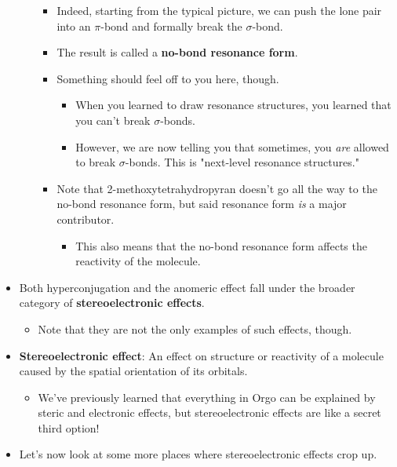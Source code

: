 \documentclass[../notes.tex]{subfiles}
\begin{document}
\begin{itemize}
\begin{itemize}
        \begin{itemize}
            \item Indeed, starting from the typical picture, we can push the lone pair into an  $\pi$-bond and formally break the  $\sigma$-bond.
            \item The result is called a \textbf{no-bond resonance form}.
            \item Something should feel off to you here, though.
            \begin{itemize}
                \item When you learned to draw resonance structures, you learned that you can't break $\sigma$-bonds.
                \item However, we are now telling you that sometimes, you \emph{are} allowed to break $\sigma$-bonds. This is "next-level resonance structures."
            \end{itemize}
            \item Note that 2-methoxytetrahydropyran doesn't go all the way to the no-bond resonance form, but said resonance form \emph{is} a major contributor.
            \begin{itemize}
                \item This also means that the no-bond resonance form affects the reactivity of the molecule.
            \end{itemize}
        \end{itemize}
    \end{itemize}
    \item Both hyperconjugation and the anomeric effect fall under the broader category of \textbf{stereoelectronic effects}.
    \begin{itemize}
        \item Note that they are not the only examples of such effects, though.
    \end{itemize}
    \item \textbf{Stereoelectronic effect}: An effect on structure or reactivity of a molecule caused by the spatial orientation of its orbitals.
    \begin{itemize}
        \item We've previously learned that everything in Orgo can be explained by steric and electronic effects, but stereoelectronic effects are like a secret third option!
    \end{itemize}
    \item Let's now look at some more places where stereoelectronic effects crop up.

\end{itemize}
\end{document}
